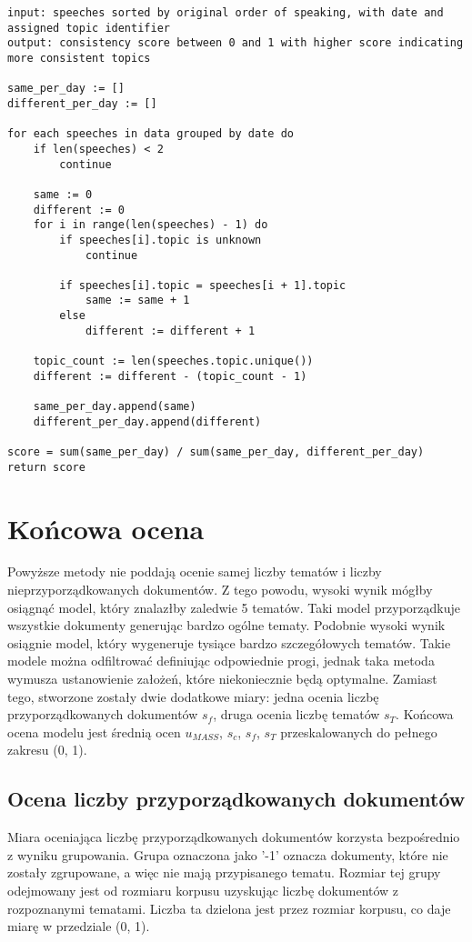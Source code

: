 	\begin{lstlisting}[style=algorithm,label=lst:consistency,caption=Algorytm obliczania spójności tematów]
input: speeches sorted by original order of speaking, with date and assigned topic identifier
output: consistency score between 0 and 1 with higher score indicating more consistent topics
	
same_per_day := []
different_per_day := []

for each speeches in data grouped by date do
	if len(speeches) < 2
		continue
	
	same := 0
	different := 0
	for i in range(len(speeches) - 1) do
		if speeches[i].topic is unknown
			continue

		if speeches[i].topic = speeches[i + 1].topic
			same := same + 1
		else
			different := different + 1

	topic_count := len(speeches.topic.unique())
	different := different - (topic_count - 1)
	
	same_per_day.append(same)
	different_per_day.append(different)

score = sum(same_per_day) / sum(same_per_day, different_per_day)
return score
	\end{lstlisting}

\section{Końcowa ocena}
	Powyższe metody nie poddają ocenie samej liczby tematów i liczby nieprzyporządkowanych dokumentów.
	Z tego powodu, wysoki wynik mógłby osiągnąć model, który znalazłby zaledwie 5 tematów.
	Taki model przyporządkuje wszystkie dokumenty generując bardzo ogólne tematy.
	Podobnie wysoki wynik osiągnie model, który wygeneruje tysiące bardzo szczegółowych tematów.
	Takie modele można odfiltrować definiując odpowiednie progi, jednak taka metoda wymusza ustanowienie założeń,
		które niekoniecznie będą optymalne.
	Zamiast tego, stworzone zostały dwie dodatkowe miary: jedna ocenia liczbę przyporządkowanych dokumentów \(s_f\), druga ocenia liczbę tematów \(s_T\).
	Końcowa ocena modelu jest średnią ocen \(u_{MASS}\), \(s_c\), \(s_f\), \(s_T\) przeskalowanych do pełnego zakresu (0, 1).

	\subsection{Ocena liczby przyporządkowanych dokumentów}
		Miara oceniająca liczbę przyporządkowanych dokumentów korzysta bezpośrednio z wyniku grupowania.
		Grupa oznaczona jako '-1' oznacza dokumenty, które nie zostały zgrupowane, a więc nie mają przypisanego tematu.
		Rozmiar tej grupy odejmowany jest od rozmiaru korpusu uzyskując liczbę dokumentów z rozpoznanymi tematami.
		Liczba ta dzielona jest przez rozmiar korpusu, co daje miarę w przedziale (0, 1).

